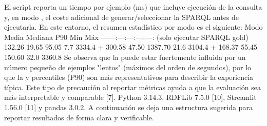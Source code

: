 {} El script  reporta un tiempo por ejemplo (ms) que incluye ejecución de la consulta y, en modo , el coste adicional de generar/seleccionar la SPARQL antes de ejecutarla. En este entorno, el resumen estadístico por modo es el siguiente:\markdownRendererInterblockSeparator
{}\markdownRendererInterblockSeparator
{}\markdownRendererPipe{} Modo \markdownRendererPipe{} Media \markdownRendererPipe{} Mediana \markdownRendererPipe{} P90 \markdownRendererPipe{} Mín \markdownRendererPipe{} Máx \markdownRendererPipe{} \markdownRendererPipe{}---\markdownRendererPipe{}---:\markdownRendererPipe{}---:\markdownRendererPipe{}---:\markdownRendererPipe{}---:\markdownRendererPipe{}---:\markdownRendererPipe{} \markdownRendererPipe{}  (solo ejecutar SPARQL gold) \markdownRendererPipe{} 132.26 \markdownRendererPipe{} 19.65 \markdownRendererPipe{} 95.05 \markdownRendererPipe{} 7.7 \markdownRendererPipe{} 3334.4 \markdownRendererPipe{} \markdownRendererPipe{}  +  \markdownRendererPipe{} 300.58 \markdownRendererPipe{} 47.50 \markdownRendererPipe{} 1387.70 \markdownRendererPipe{} 21.6 \markdownRendererPipe{} 3104.4 \markdownRendererPipe{} \markdownRendererPipe{}  +  \markdownRendererPipe{} 168.37 \markdownRendererPipe{} 55.45 \markdownRendererPipe{} 150.60 \markdownRendererPipe{} 32.0 \markdownRendererPipe{} 3360.8 \markdownRendererPipe{}\markdownRendererInterblockSeparator
{}Se observa que la  puede estar fuertemente influida por un número pequeño de ejemplos "lentos" (máximos del orden de segundos), por lo que la  y percentiles (P90) son más representativos para describir la experiencia típica. Este tipo de precaución al reportar métricas ayuda a que la evaluación sea más interpretable y comparable [7].\markdownRendererInterblockSeparator
{} Python 3.14.3, RDFLib 7.5.0 [10], Streamlit 1.56.0 [11] y pandas 3.0.2.\markdownRendererInterblockSeparator
{}A continuación se deja una estructura sugerida para reportar resultados de forma clara y verificable.\markdownRendererInterblockSeparator
{}\markdownRendererInterblockSeparator
